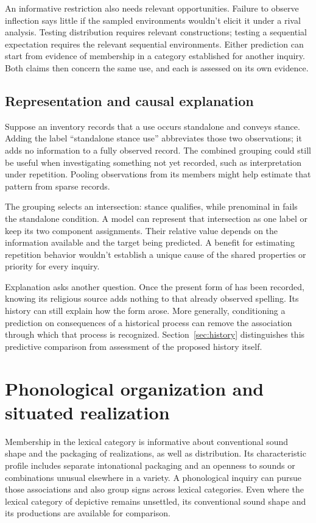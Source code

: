 \documentclass[12pt]{article}
\begin{document}
An informative restriction also needs relevant opportunities. Failure
to observe inflection says little if the sampled environments wouldn't
elicit it under a rival analysis. Testing distribution requires relevant
constructions; testing a sequential expectation requires the relevant
sequential environments. Either prediction can start from evidence
of membership in a category established for another inquiry. Both claims
then concern the same use, and each is assessed on its own evidence.

\subsection{Representation and causal explanation}

Suppose an inventory records that a use occurs standalone and conveys
stance. Adding the label \enquote{standalone stance use} abbreviates
those two observations; it adds no information to a fully observed
record. The combined grouping could still be useful when investigating
something not yet recorded, such as interpretation under repetition.
Pooling observations from its members might help estimate that pattern
from sparse records.

The grouping selects an intersection: stance  qualifies,
while prenominal  in  fails the
standalone condition. A model can represent that intersection as one
label or keep its two component assignments. Their relative value
depends on the information available and the target being predicted.
A benefit for estimating repetition behavior wouldn't establish a
unique cause of the shared properties or priority for every inquiry.

Explanation asks another question. Once the present form of 
has been recorded, knowing its religious source adds nothing to that
already observed spelling. Its history can still explain how the form
arose. More generally, conditioning a prediction on consequences of a
historical process can remove the association through which that process
is recognized. Section~\ref{sec:history} distinguishes this predictive
comparison from assessment of the proposed history itself.

\section{Phonological organization and situated realization}\label{sec:phonology}

Membership in the lexical category is informative about conventional sound
shape and the packaging of realizations, as well as distribution. Its characteristic profile includes separate intonational
packaging and an openness to sounds or combinations unusual elsewhere
in a variety. A phonological inquiry can pursue those associations
and also group signs across lexical categories. Even where the lexical
category of depictive  remains unsettled, its conventional
sound shape and its productions are available for comparison.
\end{document}
